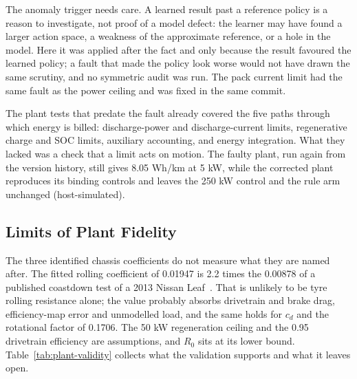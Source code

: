 \documentclass{ieeeaccess}
\begin{document}
The anomaly trigger needs care. A learned result past a reference policy is a reason to investigate, not proof of a model defect: the learner may have found a larger action space, a weakness of the approximate reference, or a hole in the model. Here it was applied after the fact and only because the result favoured the learned policy; a fault that made the policy look worse would not have drawn the same scrutiny, and no symmetric audit was run. The pack current limit had the same fault as the power ceiling and was fixed in the same commit.

The plant tests that predate the fault already covered the five paths through which energy is billed: discharge-power and discharge-current limits, regenerative charge and SOC limits, auxiliary accounting, and energy integration. What they lacked was a check that a limit acts on motion. The faulty plant, run again from the version history, still gives 8.05 Wh/km at 5 kW, while the corrected plant reproduces its binding controls and leaves the 250 kW control and the rule arm unchanged (host-simulated).

\subsection{Limits of Plant Fidelity}

The three identified chassis coefficients do not measure what they are named after. The fitted rolling coefficient of 0.01947 is 2.2 times the 0.00878 of a published coastdown test of a 2013 Nissan Leaf~\cite{inl2013leaf}. That is unlikely to be tyre rolling resistance alone; the value probably absorbs drivetrain and brake drag, efficiency-map error and unmodelled load, and the same holds for $c_{d}$ and the rotational factor of 0.1706. The 50 kW regeneration ceiling and the 0.95 drivetrain efficiency are assumptions, and $R_{0}$ sits at its lower bound. Table~\ref{tab:plant-validity} collects what the validation supports and what it leaves open.
\end{document}
